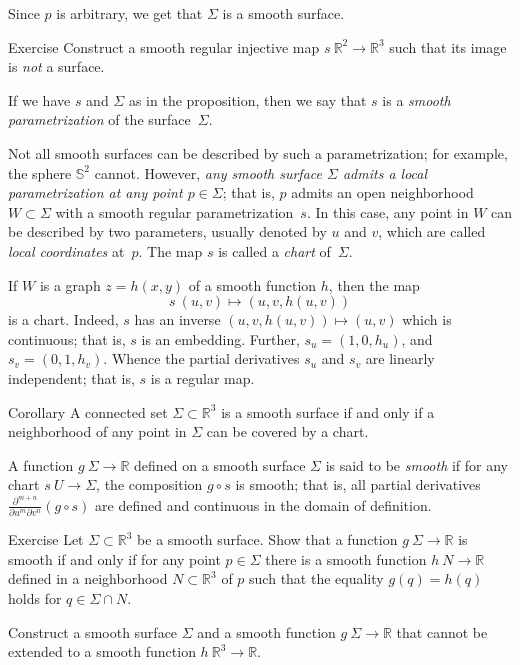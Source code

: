 Since $p$ is arbitrary, we get that $\Sigma$ is a smooth surface.
\qeds

\begin{thm}{Exercise}\label{ex:9-surf}
Construct a smooth regular injective map $s\:\mathbb{R}^2\to\mathbb{R}^3$ such that its image is \textit{not} a surface.
\end{thm}

If we have $s$ and $\Sigma$ as in the proposition, then we say that $s$ is a \emph{smooth parametrization} of the surface~$\Sigma$. 

Not all smooth surfaces can be described by such a parametrization;
for example, the sphere $\mathbb{S}^2$ cannot.
However, \textit{any smooth surface $\Sigma$ admits a local parametrization at any point $p\in\Sigma$}; that is,  $p$ admits an open neighborhood $W\subset \Sigma$ with a smooth regular parametrization~$s$.
In this case, any point in $W$ can be described by two parameters, usually denoted by $u$ and $v$, 
which are called \emph{local coordinates} at~$p$.
The map $s$ is called a \emph{chart} of~$\Sigma$.

If $W$ is a graph $z=h(x,y)$ of a smooth function $h$, then the map
\[s\:(u,v)\mapsto (u,v,h(u,v))\] is a chart.
Indeed, $s$ has an inverse $(u,v,h(u,v))\mapsto (u,v)$ which is continuous;
that is, $s$ is an embedding.
Further,
$s_u=(1,0,h_u)$, and $s_v=(0,1,h_v)$. 
Whence the partial derivatives $s_u$ and $s_v$ are linearly independent;
that is, $s$ is a regular map.

\begin{thm}{Corollary}\label{cor:reg-parmeterization}
A connected set $\Sigma\subset \mathbb{R}^3$ is a smooth surface if and only if a neighborhood of any point in $\Sigma$ can be covered by a chart.
\end{thm}

A function $g\: \Sigma \to \mathbb{R}$ defined on a smooth surface $\Sigma$ is said to be \emph{smooth} if for any chart $s \: U\to \Sigma$,
the composition $g\circ s$ is smooth; that is, all partial derivatives $\frac{\partial^{m+n}}{\partial u^m\partial v^n}(g\circ s)$ are defined and continuous in the domain of definition.

\begin{thm}{Exercise}\label{ex:smooth-fun(surf)}
Let $\Sigma\subset \mathbb{R}^3$ be a smooth surface.
Show that a function $g\:\Sigma\to\mathbb{R}$ is smooth if and only if for any point $p\in \Sigma$ there is a smooth function $h\:N\to\mathbb{R}$ defined in a neighborhood $N\subset \mathbb{R}^3$ of $p$ such that the equality $g(q)=h(q)$ holds for $q\in \Sigma\cap N$.

Construct a smooth surface $\Sigma$ and a smooth function $g\:\Sigma\to\mathbb{R}$ that cannot be extended to a smooth function $h\:\mathbb{R}^3\to\mathbb{R}$.
\end{thm}


